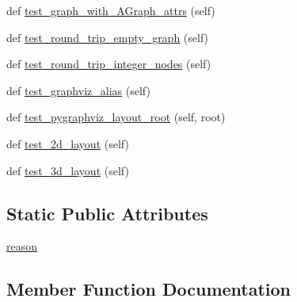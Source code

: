 \begin{DoxyCompactItemize}
\item 
def \hyperlink{classnetworkx_1_1drawing_1_1tests_1_1test__agraph_1_1TestAGraph_a2798658cbacbdc90be255d69f792ef8b}{test\+\_\+graph\+\_\+with\+\_\+\+A\+Graph\+\_\+attrs} (self)
\item 
def \hyperlink{classnetworkx_1_1drawing_1_1tests_1_1test__agraph_1_1TestAGraph_ad2afe1359fb81a264e879a08d6bb79fc}{test\+\_\+round\+\_\+trip\+\_\+empty\+\_\+graph} (self)
\item 
def \hyperlink{classnetworkx_1_1drawing_1_1tests_1_1test__agraph_1_1TestAGraph_af7674aa249d58b5fb96777392300464d}{test\+\_\+round\+\_\+trip\+\_\+integer\+\_\+nodes} (self)
\item 
def \hyperlink{classnetworkx_1_1drawing_1_1tests_1_1test__agraph_1_1TestAGraph_aacacd14a22541ca982a6df7d3132d877}{test\+\_\+graphviz\+\_\+alias} (self)
\item 
def \hyperlink{classnetworkx_1_1drawing_1_1tests_1_1test__agraph_1_1TestAGraph_a0928e1fefb31fea68a970a7dad614d00}{test\+\_\+pygraphviz\+\_\+layout\+\_\+root} (self, root)
\item 
def \hyperlink{classnetworkx_1_1drawing_1_1tests_1_1test__agraph_1_1TestAGraph_a6d7f6bdf50cb7759c3a06df7f9c20f95}{test\+\_\+2d\+\_\+layout} (self)
\item 
def \hyperlink{classnetworkx_1_1drawing_1_1tests_1_1test__agraph_1_1TestAGraph_a93909eac6d4067654889e792625b572b}{test\+\_\+3d\+\_\+layout} (self)
\end{DoxyCompactItemize}
\subsection*{Static Public Attributes}
\begin{DoxyCompactItemize}
\item 
\hyperlink{classnetworkx_1_1drawing_1_1tests_1_1test__agraph_1_1TestAGraph_a2f91fa1b16c6a7d8e2b2d73287474d61}{reason}
\end{DoxyCompactItemize}


\subsection{Member Function Documentation}
\mbox{\label{classnetworkx_1_1drawing_1_1tests_1_1test__agraph_1_1TestAGraph_a50ae269cd1d5cac16f8a746ecd812bca}} 
